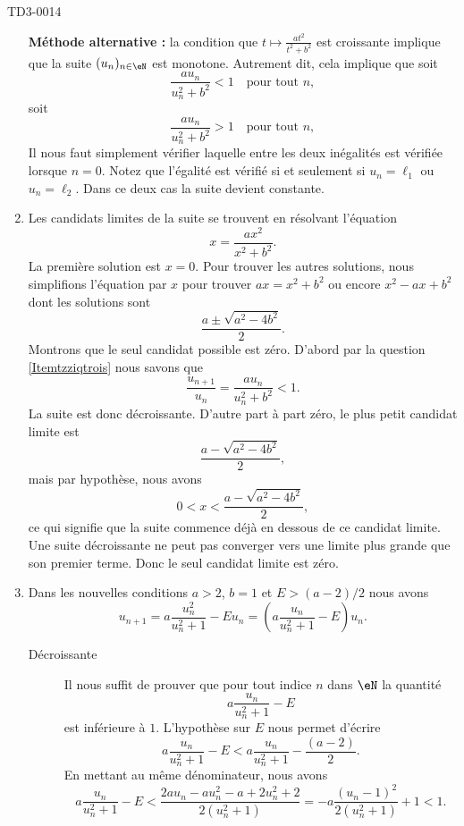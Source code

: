 \begin{corrige}{TD3-0014}
\begin{enumerate}
\noindent\textbf{Méthode alternative :} la condition que $t\mapsto  \frac{a t^2}{t^2+b^2}$ est croissante implique que la suite $(u_n)_{n\in\eN}$ est monotone. Autrement dit, cela implique que soit  
\[
\frac{au_n}{u_n^2+b^2}< 1 \quad\textrm{pour tout } n, 
\]
soit
\[
\frac{au_n}{u_n^2+b^2}> 1 \quad\textrm{pour tout } n, 
\]
Il nous faut simplement vérifier laquelle entre les deux inégalités est vérifiée lorsque $n=0$. Notez que l'égalité est vérifié si et seulement si $u_n=\ell_1$ ou $u_n=\ell_2$. Dans ce deux cas la suite devient constante. 

\item
    Les candidats limites de la suite se trouvent en résolvant l'équation
    \begin{equation}
        x=\frac{ ax^2 }{ x^2+b^2 }.
    \end{equation}
    La première solution est \( x=0\). Pour trouver les autres solutions, nous simplifions l'équation par \( x\) pour trouver \( ax=x^2+b^2\) ou encore \( x^2-ax+b^2\) dont les solutions sont
    \begin{equation}
        \frac{ a\pm\sqrt{a^2-4b^2} }{ 2 }.
    \end{equation}
    Montrons que le seul candidat possible est zéro. D'abord par la question \ref{Itemtzziqtrois} nous savons que
    \begin{equation}
        \frac{ u_{n+1} }{ u_n }=\frac{ a u_{n} }{ u_n^2+b^2 }<1.
    \end{equation}
    La suite est donc décroissante. D'autre part à part zéro, le plus petit candidat limite est 
    \begin{equation}
        \frac{ a-\sqrt{a^2-4b^2} }{ 2 },
    \end{equation}
    mais par hypothèse, nous avons
    \begin{equation}
        0<x<\frac{ a-\sqrt{a^2-4b^2} }{ 2 },
    \end{equation}
    ce qui signifie que la suite commence déjà en dessous de ce candidat limite. Une suite décroissante ne peut pas converger vers une limite plus grande que son premier terme. Donc le seul candidat limite est zéro.

\item Dans les nouvelles conditions $a>2$, $b=1$ et $E> (a-2)/2$ nous avons
  \begin{equation}
    	u_{n+1}=a\frac{ u_n^2 }{ u_n^2+1 }-Eu_n= \left(a\frac{ u_n }{ u_n^2+1 }-E\right)u_n.
  \end{equation}
  \begin{description}
      \item[Décroissante] 
Il nous suffit de prouver que pour tout indice $n$ dans $\eN$ la quantité 
\[
a\frac{ u_n }{ u_n^2+1 }-E
\]
est inférieure à $1$. L'hypothèse sur $E$ nous permet d'écrire
\[
  a\frac{ u_n }{ u_n^2+1 }-E<  a\frac{ u_n }{ u_n^2+1 }-\frac{(a-2)}{2}.
\]
En mettant au même dénominateur, nous avons
\begin{equation}
    a\frac{ u_n }{ u_n^2+1 }-E<\frac{ 2au_n-au_n^2-a+2u_n^2+2 }{ 2(u_n^2+1) }=-a\frac{ (u_n-1)^2 }{ 2(u_n^2+1) }+1<1.
\end{equation}


\end{description}
\end{enumerate}
\end{corrige}
